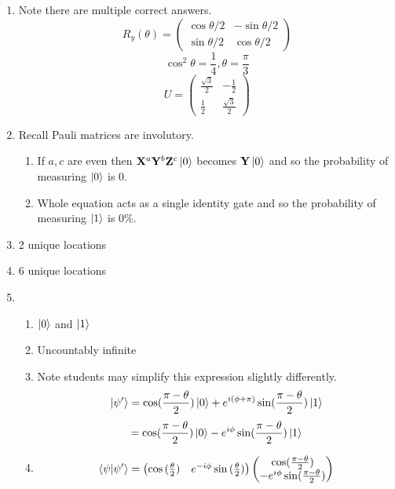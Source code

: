 \documentclass[12pt]{article}
\begin{document}
\begin{enumerate}[font=\bfseries]
    \item Note there are multiple correct answers.
    \[R_y(\theta) = \begin{pmatrix} \cos{\theta/2} & -\sin{\theta/2} \\
        \sin{\theta/2} & \cos{\theta/2}
        \end{pmatrix}\]
        \[\cos^2{\theta} = \frac{1}{4}, \theta = \frac{\pi}{3}\]
        \[U = \begin{pmatrix} 
        \frac{\sqrt{3}}{2} & -\frac{1}{2} \\
        \frac{1}{2} & \frac{\sqrt{3}}{2}
            \end{pmatrix}
        \]
    \item Recall Pauli matrices are involutory.
        \begin{enumerate}
            \item If $a,c$ are even then $\mathbf{X}^a\mathbf{Y}^b\mathbf{Z}^c\ket{0}$ becomes $\mathbf{Y}\ket{0}$ and so the probability of measuring $\ket{0}$ is 0. 
            \item Whole equation acts as a single identity gate and so the probability of measuring $\ket{1}$ is 0\%.
        \end{enumerate}
    \item 2 unique locations
    \item 6 unique locations
    \item \begin{enumerate}
        \item $\ket{0}$ and $\ket{1}$
        \item Uncountably infinite
        \item Note students may simplify this expression slightly differently.
        \[ \ket{\psi'} = \cos({\frac{\pi - \theta}{2})\ket{0}+e^{i(\phi + \pi)}\sin({\frac{\pi - \theta}{2}})\ket{1}}
        \]
        \[
        = \cos({\frac{\pi - \theta}{2})\ket{0}-e^{i\phi}\sin({\frac{\pi - \theta}{2}})\ket{1}}
        \]
        \item 
        \[
        \braket{\psi|\psi'} = 
        \begin{pmatrix}
            \cos{(\frac{\theta}{2})} & e^{-i\phi}\sin{(\frac{\theta}{2})}
        \end{pmatrix}
        \begin{pmatrix}
            \cos({\frac{\pi-\theta}{2})} \\
            -e^{i\phi}\sin({\frac{\pi - \theta}{2}})
        \end{pmatrix}
        \]

\end{enumerate}
\end{enumerate}
\end{document}
